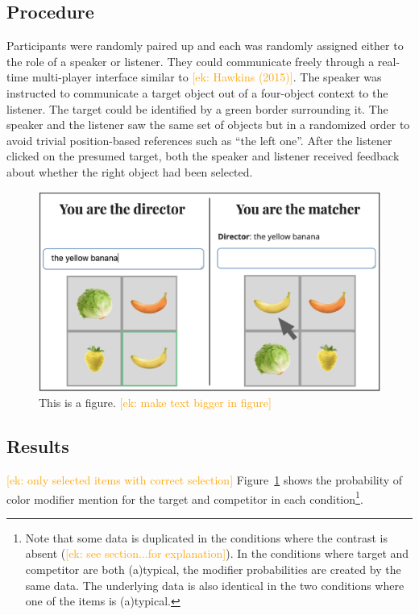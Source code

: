 \documentclass[10pt,letterpaper]{article}
\newcommand{\ek}[1]{\textcolor{Orange}{[ek: #1]}}
\begin{document}
\subsection{Procedure}
Participants were randomly paired up and each was randomly assigned either to the role of a speaker or listener. They could communicate freely through a real-time multi-player interface similar to \ek{Hawkins (2015)}. The speaker was instructed to communicate a target object out of a four-object context to the listener. The target could be identified by a green border surrounding it. The speaker and the listener saw the same set of objects but in a randomized order to avoid trivial position-based references such as ``the left one''. After the listener clicked on the presumed target, both the speaker and listener received feedback about whether the right object had been selected.

\begin{figure}
	\begin{center}
		\includegraphics[width=.475\textwidth]{graphs/prod-design.pdf}
	\end{center}
\caption{This is a figure. \ek{make text bigger in figure}} 
\label{prod-results}
\end{figure}


\subsection{Results}
\ek{only selected items with correct selection}
Figure~\ref{prod-results} shows the probability of color modifier mention for the target and competitor in each condition\footnote{Note that some data is duplicated in the conditions where the contrast is absent (\ek{see section...for explanation}). In the conditions where target and competitor are both (a)typical, the modifier probabilities are created by the same data. The underlying data is also identical in the two conditions where one of the items is (a)typical.}. 
\end{document}
